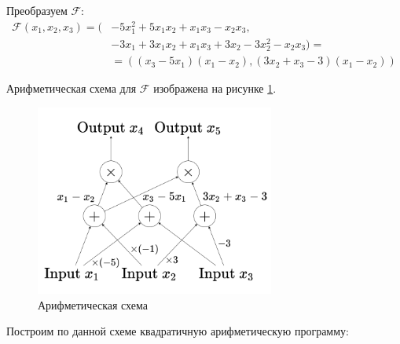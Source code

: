 \documentclass[12pt, a4paper]{extarticle}
\begin{document}
Преобразуем $\mathcal{F}$:
\begin{equation*}
    \begin{split}
        \mathcal{F}(x_1, x_2, x_3) = (& -5x_1^2+5x_1x_2+x_1x_3 - x_2x_3, \\ 
        & -3x_1+3x_1x_2+x_1x_3+3x_2-3x_2^2-x_2x_3) = \\
        & = \left((x_3 - 5x_1)(x_1 - x_2), (3x_2 + x_3 - 3)(x_1 - x_2)\right)
    \end{split}
\end{equation*}

Арифметическая схема для $\mathcal{F}$ изображена на рисунке \ref{arithmetic-circuit}.

\begin{figure}[h]
    \centering
    \includegraphics[width=0.7\textwidth]{arithmetic-circuit-hw_7.png}
    \caption{Арифметическая схема}
    \label{arithmetic-circuit}
\end{figure}

Построим по данной схеме квадратичную арифметическую программу:
\end{document}
